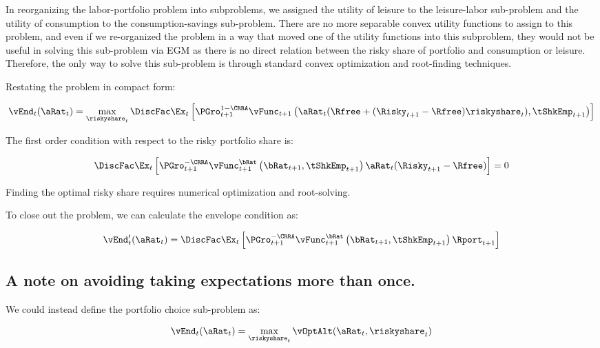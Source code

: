 \documentclass[\econtexRoot/EGMN]{subfiles}
\begin{document}
In reorganizing the labor-portfolio problem into subproblems, we assigned the utility of leisure to the leisure-labor sub-problem and the utility of consumption to the consumption-savings sub-problem. There are no more separable convex utility functions to assign to this problem, and even if we re-organized the problem in a way that moved one of the utility functions into this subproblem, they would not be useful in solving this sub-problem via EGM as there is no direct relation between the risky share of portfolio and consumption or leisure. Therefore, the only way to solve this sub-problem is through standard convex optimization and root-finding techniques.

Restating the problem in compact form:

\begin{equation}
    \vEnd_{t}(\aRat_{t}) = \max_{\riskyshare_{t}} \DiscFac \Ex_{t} \left[ \PGro_{t+1}^{1-\CRRA}
    \vFunc_{t+1}\left(\aRat_{t}(\Rfree + (\Risky_{t+1} - \Rfree) \riskyshare_{t}), \tShkEmp_{t+1}\right)
    \right]
\end{equation}

The first order condition with respect to the risky portfolio share is:

\begin{equation}
    \DiscFac \Ex_{t} \left[ \PGro_{t+1}^{-\CRRA} \vFunc_{t+1}^{\bRat}\left(\bRat_{t+1}, \tShkEmp_{t+1}\right) \aRat_{t}(\Risky_{t+1} - \Rfree)  \right] = 0
\end{equation}

Finding the optimal risky share requires numerical optimization and root-solving.

To close out the problem, we can calculate the envelope condition as:

\begin{equation}
    \vEnd_{t}'(\aRat_{t}) = \DiscFac \Ex_{t} \left[ \PGro_{t+1}^{-\CRRA} \vFunc_{t+1}^{\bRat}\left(\bRat_{t+1}, \tShkEmp_{t+1}\right) \Rport_{t+1}  \right]
\end{equation}

\subsection{A note on avoiding taking expectations more than once.}

We could instead define the portfolio choice sub-problem as:

\begin{equation}
    \vEnd_{t}(\aRat_{t}) = \max_{\riskyshare_{t}} \vOptAlt(\aRat_{t}, \riskyshare_{t})
\end{equation}
\end{document}
